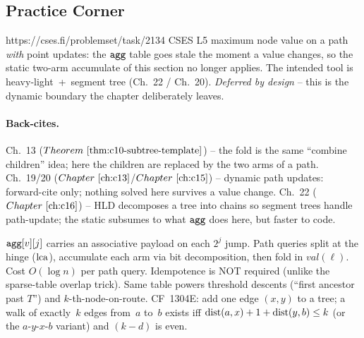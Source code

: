 \subsection{Practice Corner}

\begin{practiceset}
    {https://cses.fi/problemset/task/2134}
    {CSES L5}
    {maximum node value on a path \emph{with} point updates: the
     \(\texttt{agg}\) table goes stale the moment a value changes, so the
     static two-arm accumulate of this section no longer applies.  The
     intended tool is heavy-light \,+\, segment tree (Ch.~22 / Ch.~20).
     \emph{Deferred by design} -- this is the dynamic boundary the
     chapter deliberately leaves.}
\end{practiceset}

\paragraph{Back-cites.}
Ch.~13 (\(\thmref{c10-subtree-template}\)) -- the fold is the same
``combine children'' idea; here the children are replaced by the two
arms of a path.
Ch.~19/20 (\(\chref{c13}\)/\(\chref{c15}\)) -- dynamic path updates:
forward-cite only; nothing solved here survives a value change.
Ch.~22 (\(\chref{c16}\)) -- HLD decomposes a tree into chains so segment
trees handle path-update; the static subsumes to what \(\texttt{agg}\) does
here, but faster to code.

\begin{recallbox}
\(\texttt{agg}[v][j]\) carries an associative payload on each \(2^j\) jump.
Path queries split at the hinge (\(\operatorname{lca}\)), accumulate each arm via bit
decomposition, then fold in \(\mathit{val}(\ell)\).  Cost \(O(\log n)\)
per path query.  Idempotence is NOT required (unlike the sparse-table
overlap trick).  Same table powers threshold descents (``first ancestor
past \(T\)'') and \(k\)-th-node-on-route.  CF~1304E: add one edge
\((x,y)\) to a tree; a walk of exactly~\(k\) edges from~\(a\) to~\(b\)
exists iff \(\operatorname{dist}(a,x)+1+\operatorname{dist}(y,b) \le k\) (or the \(a\)-\(y\)-\(x\)-\(b\)
variant) and \((k - d)\) is even.
\end{recallbox}
